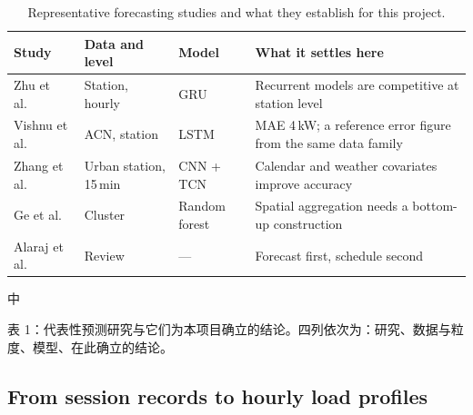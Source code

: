 \documentclass[10pt,a4paper]{article}
\newenvironment{zh}{%
  \par\vspace{1pt}%
  \begingroup
  \color{black!72}\small
  \setlength{\parskip}{0pt}%
  \noindent\textsf{\footnotesize 中}\hspace{3pt}\ignorespaces
}{%
  \par\endgroup\vspace{4pt}%
}
\begin{document}
\begin{table}[H]
\centering
\caption{Representative forecasting studies and what they establish for this project.}
\label{tab:lit}
\small
\renewcommand{\arraystretch}{1.15}
\begin{tabular}{@{}p{3.3cm}p{3.6cm}p{3.0cm}p{5.0cm}@{}}
\toprule
Study & Data and level & Model & What it settles here \\
\midrule
Zhu et al.~\cite{Zhu2019ShortTermEVLoadDL} & Station, hourly & GRU & Recurrent models are competitive at station level \\
Vishnu et al.~\cite{Vishnu2023ShortTermEVLoadTSMLDL} & ACN, station & LSTM & MAE 4\,kW; a reference error figure from the same data family \\
Zhang et al.~\cite{Zhang2022MCCNNTCN} & Urban station, 15\,min & CNN + TCN & Calendar and weather covariates improve accuracy \\
Ge et al.~\cite{Ge2020SpatialTemporalEVLoadProfile} & Cluster & Random forest & Spatial aggregation needs a bottom-up construction \\
Alaraj et al.~\cite{Alaraj2025MLChargingDemandReview} & Review & --- & Forecast first, schedule second \\
\bottomrule
\end{tabular}
\end{table}

\begin{zh}
表 1：代表性预测研究与它们为本项目确立的结论。四列依次为：研究、数据与粒度、模型、在此确立的结论。
\end{zh}

\subsection{From session records to hourly load profiles}
\end{document}
